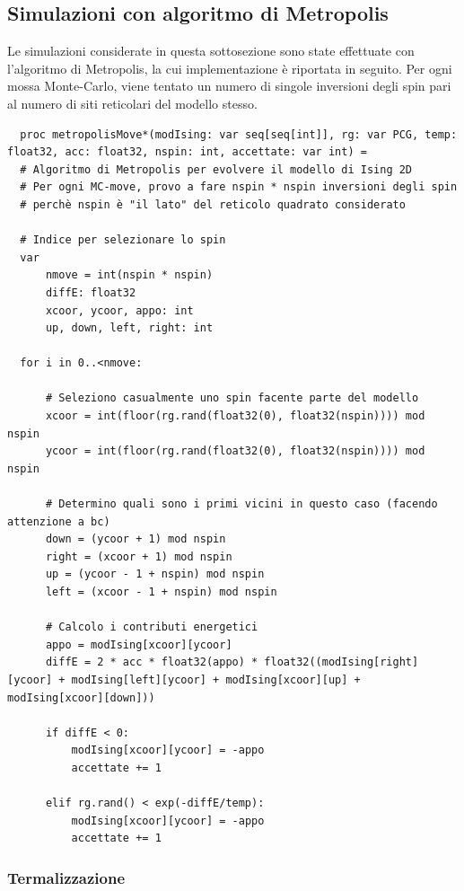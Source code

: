 \subsection{Simulazioni con algoritmo di Metropolis}

Le simulazioni considerate in questa sottosezione sono state effettuate con l'algoritmo di Metropolis, la cui 
implementazione è riportata in seguito. Per ogni mossa Monte-Carlo, viene tentato un numero di singole inversioni degli spin 
pari al numero di siti reticolari del modello stesso.

\begin{verbatim}
  proc metropolisMove*(modIsing: var seq[seq[int]], rg: var PCG, temp: float32, acc: float32, nspin: int, accettate: var int) = 
  # Algoritmo di Metropolis per evolvere il modello di Ising 2D
  # Per ogni MC-move, provo a fare nspin * nspin inversioni degli spin
  # perchè nspin è "il lato" del reticolo quadrato considerato

  # Indice per selezionare lo spin
  var 
      nmove = int(nspin * nspin)
      diffE: float32
      xcoor, ycoor, appo: int
      up, down, left, right: int

  for i in 0..<nmove:

      # Seleziono casualmente uno spin facente parte del modello
      xcoor = int(floor(rg.rand(float32(0), float32(nspin)))) mod nspin
      ycoor = int(floor(rg.rand(float32(0), float32(nspin)))) mod nspin

      # Determino quali sono i primi vicini in questo caso (facendo attenzione a bc)
      down = (ycoor + 1) mod nspin
      right = (xcoor + 1) mod nspin
      up = (ycoor - 1 + nspin) mod nspin
      left = (xcoor - 1 + nspin) mod nspin

      # Calcolo i contributi energetici
      appo = modIsing[xcoor][ycoor]
      diffE = 2 * acc * float32(appo) * float32((modIsing[right][ycoor] + modIsing[left][ycoor] + modIsing[xcoor][up] + modIsing[xcoor][down]))

      if diffE < 0:
          modIsing[xcoor][ycoor] = -appo
          accettate += 1

      elif rg.rand() < exp(-diffE/temp):
          modIsing[xcoor][ycoor] = -appo
          accettate += 1
\end{verbatim}   



\subsubsection{Termalizzazione}

